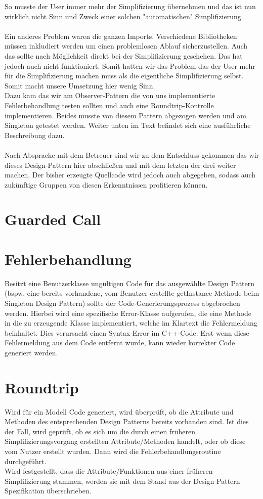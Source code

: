 So musste der User immer mehr der Simplifizierung übernehmen und das ist nun
wirklich nicht Sinn und Zweck einer solchen "automatischen" Simplifizierung.\\
\\
Ein anderes Problem waren die ganzen Imports. Verschiedene Bibliotheken müssen
inkludiert werden um einen problemlosen Ablauf sicherzustellen. Auch das sollte
nach Möglichkeit direkt bei der Simplifizierung geschehen. Das hat jedoch auch
nicht funktioniert. Somit hatten wir das Problem das der User mehr für die
Simplifizierung machen muss als die eigentliche Simplifizierung selbst. Somit
macht unsere Umsetzung hier wenig Sinn.\\
Dazu kam das wir am Observer-Pattern die von uns implementierte Fehlerbehandlung
testen sollten und auch eine Roundtrip-Kontrolle implementieren. Beides musste
von diesem Pattern abgezogen werden und am Singleton getestet werden. Weiter
unten im Text befindet sich eine ausführliche Beschreibung dazu.\\ \\
Nach Absprache mit dem Betreuer sind wir zu dem Entschluss gekommen das wir
dieses Design-Pattern hier abschließen und mit dem letzten der drei weiter machen.
Der bisher erzeugte Quellcode wird jedoch auch abgegeben, sodass auch zukünftige
Gruppen von diesen Erkenntnissen profitieren können.

\section{Guarded Call}

\section{Fehlerbehandlung}

Besitzt eine Benutzerklasse ungültigen Code für das ausgewählte Design Pattern (bspw. eine 
bereits vorhandene, vom Benutzer erstellte getInstance Methode beim Singleton Design Pattern) 
sollte der Code-Generierungsprozess abgebrochen werden. Hierbei wird eine spezifische Error-Klasse aufgerufen, die eine Methode in die zu erzeugende Klasse implementiert, welche im Klartext die Fehlermeldung beinhaltet. Dies verursacht einen Syntax-Error im C++-Code. Erst wenn diese Fehlermeldung aus dem Code entfernt wurde, kann wieder korrekter Code generiert werden.

\section{Roundtrip}

Wird für ein Modell Code generiert, wird überprüft, ob die Attribute und Methoden des entsprechenden Design Patterns bereits vorhanden sind. Ist dies der Fall, wird geprüft, ob es sich um die durch einen früheren Simplifizierungsvorgang erstellten Attribute/Methoden handelt, oder ob diese vom Nutzer erstellt wurden. Dann wird die Fehlerbehandlungsroutine durchgeführt. \\
Wird festgestellt, dass die Attribute/Funktionen aus einer früheren Simplifizierung stammen, werden sie mit dem Stand aus der Design Pattern Spezifikation überschrieben.
